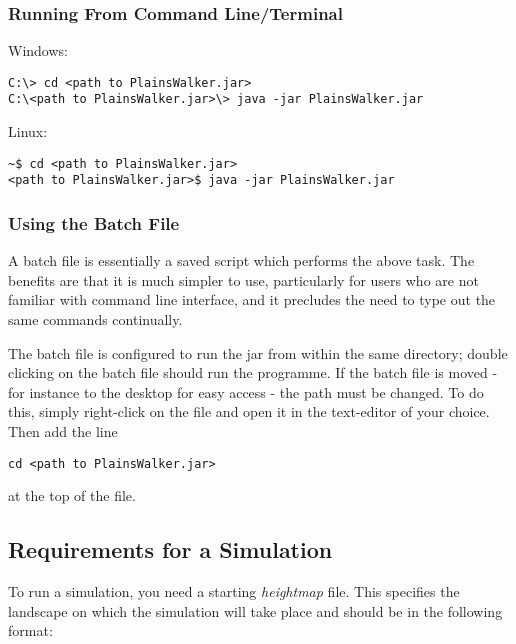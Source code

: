 \subsubsection{Running From Command Line/Terminal}

Windows:
\begin{center}
\begin{verbatim}
C:\> cd <path to PlainsWalker.jar>
C:\<path to PlainsWalker.jar>\> java -jar PlainsWalker.jar
\end{verbatim}
\end{center}


\noindent Linux:
\begin{center}
\begin{verbatim}
~$ cd <path to PlainsWalker.jar>
<path to PlainsWalker.jar>$ java -jar PlainsWalker.jar
\end{verbatim}
\end{center}

\subsubsection{Using the Batch File}
A batch file is essentially a saved script which performs the above task. The benefits are that it is much simpler to use, particularly for users who are not familiar with command line interface, and it precludes the need to type out the same commands continually.

\vspace{6 mm}

\noindent The batch file is configured to run the jar from within the same directory; double clicking on the batch file should run the programme. If the batch file is moved - for instance to the desktop for easy access - the path must be changed. To do this, simply right-click on the file and open it in the text-editor of your choice. Then add the line
\begin{center}
\begin{verbatim}
cd <path to PlainsWalker.jar>
\end{verbatim}
\end{center}
\noindent at the top of the file.

\subsection{Requirements for a Simulation}

To run a simulation, you need a starting \emph{heightmap} file. This specifies the landscape on which the simulation will take place and should be in the following format:

